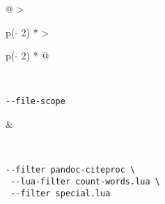 \begin{longtable}[]{@{}
  >{\raggedright\arraybackslash}p{(\columnwidth - 2\tabcolsep) * }
  >{\raggedright\arraybackslash}p{(\columnwidth - 2\tabcolsep) * }@{}}
\begin{minipage}[t]{\linewidth}
\begin{Shaded}
\begin{Highlighting}[]
\KeywordTok{:}\AttributeTok{ }
\end{Highlighting}
\end{Shaded}
\end{minipage} \\
\begin{minipage}[t]{\linewidth}\raggedright
\begin{verbatim}
--file-scope
\end{verbatim}
\end{minipage} & \begin{minipage}[t]{\linewidth}\raggedright
\begin{Shaded}
\begin{Highlighting}[]
\KeywordTok{:}\AttributeTok{ }
\end{Highlighting}
\end{Shaded}
\end{minipage} \\
\begin{minipage}[t]{\linewidth}\raggedright
\begin{verbatim}
--filter pandoc-citeproc \
 --lua-filter count-words.lua \
 --filter special.lua


\end{verbatim}
\end{minipage}
\end{longtable}
